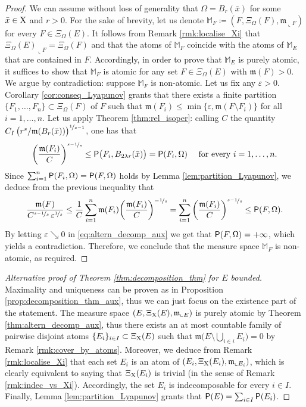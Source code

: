 \documentclass[reqno]{amsart}
\numberwithin{equation}{section}
\newcommand{\X}{{\rm X}}
\newcommand{\mm}{\mathfrak m}
\newcommand{\1}{\mathbbm 1}
\newcommand{\eps}{\varepsilon}
\renewcommand{\P}{{\sf P}}
\begin{document}
\begin{proof}
We can assume without loss of generality that
\(\Omega=B_r(\bar x)\) for some \(\bar x\in\X\) and \(r>0\).
For the sake of brevity, let us denote
\(\mathbb M_F\coloneqq(F,\Xi_\Omega(F),\mm_{\llcorner F})\)
for every \(F\in\Xi_\Omega(E)\). It follows from Remark \ref{rmk:localise_Xi} that
\(\Xi_\Omega(E)_{\llcorner F}=\Xi_\Omega(F)\) and that the atoms of \(\mathbb M_F\)
coincide with the atoms of \(\mathbb M_E\) that are contained in \(F\). Accordingly,
in order to prove that \(\mathbb M_E\) is purely atomic, it suffices to show that
\(\mathbb M_F\) is atomic for any set \(F\in\Xi_\Omega(E)\) with \(\mm(F)>0\).
We argue by contradiction: suppose \(\mathbb M_F\) is non-atomic. Let us fix any
\(\eps>0\). Corollary \ref{cor:conseq_Lyapunov} grants that there exists a finite
partition \(\{F_1,\ldots,F_n\}\subset\Xi_\Omega(F)\) of \(F\) such that
\(\mm(F_i)\leq\min\big\{\eps,\mm(F\setminus F_i)\big\}\) for all \(i=1,\ldots,n\).
Let us apply Theorem \ref{thm:rel_isoper}: calling
\(C\) the quantity \(C_I\,\big(r^s/\mm(B_r(\bar x))\big)^{\nicefrac{1}{s-1}}\),
one has that
\[
\bigg(\frac{\mm(F_i)}{C}\bigg)^{\nicefrac{s-1}{s}}\leq
\P\big(F_i,B_{2\lambda r}(\bar x)\big)=\P(F_i,\Omega)\quad\text{ for every }i=1,\ldots,n.
\]
Since \(\sum_{i=1}^n\P(F_i,\Omega)=\P(F,\Omega)\) holds by Lemma
\ref{lem:partition_Lyapunov}, we deduce from the previous inequality that
\begin{equation}\label{eq:altern_decomp_aux}
\frac{\mm(F)}{C^{\nicefrac{s-1}{s}}\,\eps^{\nicefrac{1}{s}}}
\leq\frac{1}{C}\sum_{i=1}^n\mm(F_i)\bigg(\frac{\mm(F_i)}{C}\bigg)^{-\nicefrac{1}{s}}
=\sum_{i=1}^n\bigg(\frac{\mm(F_i)}{C}\bigg)^{\nicefrac{s-1}{s}}\leq\P(F,\Omega).
\end{equation}
By letting \(\eps\searrow 0\) in \eqref{eq:altern_decomp_aux} we get that
\(\P(F,\Omega)=+\infty\), which yields a contradiction.
Therefore, we conclude that the measure space \(\mathbb M_F\) is non-atomic, as required.
\end{proof}
%
%
\begin{proof}[Alternative proof of Theorem \ref{thm:decomposition_thm} for \(E\) bounded]
Maximality and uniqueness can be proven as in Proposition \ref{prop:decomposition_thm_aux},
thus we can just focus on the existence part of the statement. The measure space
\((E,\Xi_\X(E),\mm_{\llcorner E})\) is purely atomic by Theorem
\ref{thm:altern_decomp_aux}, thus there exists an at most countable
family of pairwise disjoint atoms \(\{E_i\}_{i\in I}\subset\Xi_\X(E)\)
such that \(\mm\big(E\setminus\bigcup_{i\in i}E_i\big)=0\) by Remark
\ref{rmk:cover_by_atoms}. Moreover, we deduce from Remark \ref{rmk:localise_Xi}
that each set \(E_i\) is an atom of \((E_i,\Xi_\X(E_i),\mm_{\llcorner E_i})\),
which is clearly equivalent to saying that \(\Xi_\X(E_i)\) is trivial (in the
sense of Remark \ref{rmk:indec_vs_Xi}). Accordingly, the set \(E_i\) is indecomposable
for every \(i\in I\). Finally, Lemma \ref{lem:partition_Lyapunov}
grants that \(\P(E)=\sum_{i\in I}\P(E_i)\).
\end{proof}
\end{document}
